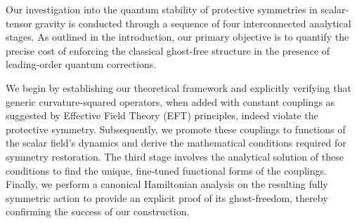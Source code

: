 \documentclass[twocolumn]{aastex631}
\begin{document}
Our investigation into the quantum stability of protective symmetries in scalar-tensor gravity is conducted through a sequence of four interconnected analytical stages. As outlined in the introduction, our primary objective is to quantify the precise cost of enforcing the classical ghost-free structure in the presence of leading-order quantum corrections.

We begin by establishing our theoretical framework and explicitly verifying that generic curvature-squared operators, when added with constant couplings as suggested by Effective Field Theory (EFT) principles, indeed violate the protective symmetry. Subsequently, we promote these couplings to functions of the scalar field's dynamics and derive the mathematical conditions required for symmetry restoration. The third stage involves the analytical solution of these conditions to find the unique, fine-tuned functional forms of the couplings. Finally, we perform a canonical Hamiltonian analysis on the resulting fully symmetric action to provide an explicit proof of its ghost-freedom, thereby confirming the success of our construction.
\end{document}
